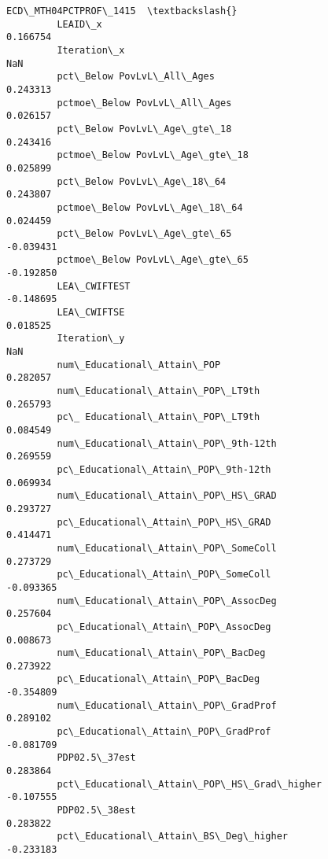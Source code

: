 \documentclass[11pt]{article}
\begin{document}
\begin{Verbatim}[commandchars=\\\{\}]
                                                    ECD\_MTH04PCTPROF\_1415  \textbackslash{}
         LEAID\_x                                                 0.166754   
         Iteration\_x                                                  NaN   
         pct\_Below PovLvL\_All\_Ages                               0.243313   
         pctmoe\_Below PovLvL\_All\_Ages                            0.026157   
         pct\_Below PovLvL\_Age\_gte\_18                             0.243416   
         pctmoe\_Below PovLvL\_Age\_gte\_18                          0.025899   
         pct\_Below PovLvL\_Age\_18\_64                              0.243807   
         pctmoe\_Below PovLvL\_Age\_18\_64                           0.024459   
         pct\_Below PovLvL\_Age\_gte\_65                            -0.039431   
         pctmoe\_Below PovLvL\_Age\_gte\_65                         -0.192850   
         LEA\_CWIFTEST                                           -0.148695   
         LEA\_CWIFTSE                                             0.018525   
         Iteration\_y                                                  NaN   
         num\_Educational\_Attain\_POP                              0.282057   
         num\_Educational\_Attain\_POP\_LT9th                        0.265793   
         pc\_ Educational\_Attain\_POP\_LT9th                        0.084549   
         num\_Educational\_Attain\_POP\_9th-12th                     0.269559   
         pc\_Educational\_Attain\_POP\_9th-12th                      0.069934   
         num\_Educational\_Attain\_POP\_HS\_GRAD                      0.293727   
         pc\_Educational\_Attain\_POP\_HS\_GRAD                       0.414471   
         num\_Educational\_Attain\_POP\_SomeColl                     0.273729   
         pc\_Educational\_Attain\_POP\_SomeColl                     -0.093365   
         num\_Educational\_Attain\_POP\_AssocDeg                     0.257604   
         pc\_Educational\_Attain\_POP\_AssocDeg                      0.008673   
         num\_Educational\_Attain\_POP\_BacDeg                       0.273922   
         pc\_Educational\_Attain\_POP\_BacDeg                       -0.354809   
         num\_Educational\_Attain\_POP\_GradProf                     0.289102   
         pc\_Educational\_Attain\_POP\_GradProf                     -0.081709   
         PDP02.5\_37est                                           0.283864   
         pct\_Educational\_Attain\_POP\_HS\_Grad\_higher              -0.107555   
         PDP02.5\_38est                                           0.283822   
         pct\_Educational\_Attain\_BS\_Deg\_higher                   -0.233183   

\end{Verbatim}
\end{document}
